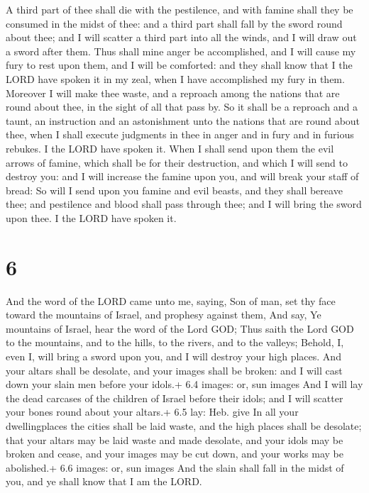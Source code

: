  A third part of thee shall die with the pestilence, and
with famine shall they be consumed in the midst of thee: and a third
part shall fall by the sword round about thee; and I will scatter a
third part into all the winds, and I will draw out a sword after them.
 Thus shall mine anger be accomplished, and I will cause my
fury to rest upon them, and I will be comforted: and they shall know
that I the LORD have spoken it in my zeal, when I have accomplished my
fury in them.  Moreover I will make thee waste, and a
reproach among the nations that are round about thee, in the sight of
all that pass by.  So it shall be a reproach and a taunt,
an instruction and an astonishment unto the nations that are round about
thee, when I shall execute judgments in thee in anger and in fury and in
furious rebukes. I the LORD have spoken it.  When I shall
send upon them the evil arrows of famine, which shall be for their
destruction, and which I will send to destroy you: and I will increase
the famine upon you, and will break your staff of bread: 
So will I send upon you famine and evil beasts, and they shall bereave
thee; and pestilence and blood shall pass through thee; and I will bring
the sword upon thee. I the LORD have spoken it.

\hypertarget{section-5}{%
\section{6}\label{section-5}}

 And the word of the LORD came unto me, saying, 
Son of man, set thy face toward the mountains of Israel, and prophesy
against them,  And say, Ye mountains of Israel, hear the
word of the Lord GOD; Thus saith the Lord GOD to the mountains, and to
the hills, to the rivers, and to the valleys; Behold, I, even I, will
bring a sword upon you, and I will destroy your high places.
 And your altars shall be desolate, and your images shall be
broken: and I will cast down your slain men before your idols.+ 6.4
images: or, sun images  And I will lay the dead carcases of
the children of Israel before their idols; and I will scatter your bones
round about your altars.+ 6.5 lay: Heb. give  In all your
dwellingplaces the cities shall be laid waste, and the high places shall
be desolate; that your altars may be laid waste and made desolate, and
your idols may be broken and cease, and your images may be cut down, and
your works may be abolished.+ 6.6 images: or, sun images 
And the slain shall fall in the midst of you, and ye shall know that I
am the LORD.

